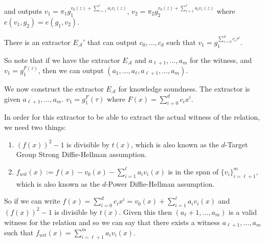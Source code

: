 \documentclass[12pt]{tufte-book}
\begin{document}
and outputs $v_1 = \pi_1 g_1^{v_0(z) + \sum_{i=1}^\ell a_i v_i(z)}$, $v_2 = \pi_2 g_2^{v_0(z) + \sum_{i=1}^\ell a_i v_i(z)}$ where $e(v_1, g_2) = e(g_1, v_2)$.

There is an extractor $E_\mathcal{A}'$ that can output $c_0, \dots, c_d$ such that $v_1 = g_1^{\sum_{i=0}^d c_i \tau^i}$.

So note that if we have the extractor $E_\mathcal{A}$ and $a_{\ell+1}, \dots, a_m$ for the witness, and $v_1 = g_1^{F(z)}$, then we can output $(a_1, \dots, a_\ell, a_{\ell+1}, \dots, a_m)$.

We now construct the extractor $E_\mathcal{A}$ for knowledge soundness. The extractor is given $a_{\ell+1}, \dots, a_m$. $v_1 = g_1^F(\tau)$ where $F(x) = \sum_{i=0}^d c_i x^i$.

In order for this extractor to be able to extract the actual witness of the relation, we need two things:
\begin{enumerate}
    \item $(f(x))^2 - 1$ is divisible by $t(x)$, which is also known as the $d$-Target Group Strong Diffie-Hellman assumption.
    \item $f_{wit}(x) := f(x) - v_0(x) - \sum_{i=1}^\ell a_i v_i(x)$ is in the span of $\{v_i\}_{i=\ell+1}^m$, which is also known as the $d$-Power Diffie-Hellman assumption.
\end{enumerate}

So if we can write $f(x) = \sum_{i=0}^d c_i x^i = v_0(x) + \sum_{i=1}^\ell a_i v_i(x)$ and $(f(x))^2 - 1$ is divisible by $t(x)$. Given this then $(a_\ell+1, \dots, a_m)$ is a valid witness for the relation and so we can say that there exists a witness $a_{\ell+1}, \dots, a_m$ such that $f_{wit}(x) = \sum_{i=\ell+1}^m a_i v_i(x)$.
 \newcommand{\proofsketch}{\smallskip\noindent{\bf Proof sketch. }}
\algrenewcommand{}
\newcommand{\bits}{\set{0,1}}
\newcommand{\Ex}{\mathbb{E}}

\renewcommand{\O}{\ensuremath{\mathcal{O}}}
\newcommand{\To}{\rightarrow}
\newcommand{\e}{\epsilon}
\newcommand{\R}{\mathbb{R}}
\newcommand{\N}{\mathbb{N}}
\newcommand{\Z}{\mathbb{Z}}
\newcommand{\logAnd}{\wedge}

\newcommand{\indis}{\mathrel{\overset{\makebox[0pt]{\mbox{\normalfont\tiny c}}}{\approx}}}
\newcommand{\allindis}{\mathrel{\overset{\makebox[0pt]{\mbox{\normalfont\tiny p/s/c}}}{\approx}}}

\newcommand{\cclass}[1]{\mathsf{#1}}
\renewcommand{\P}{\cclass{P}}
\newcommand{\NP}{\cclass{NP}}
\newcommand{\Time}{\cclass{Time}}
\newcommand{\BPP}{\cclass{BPP}}
\newcommand{\Size}{\cclass{Size}}
\newcommand{\Ppoly}{\cclass{P_{/poly}}}
\newcommand{\CSAT}{\ensuremath{\mathsf{CSAT}}}
\newcommand{\SAT}{\ensuremath{\mathsf{3SAT}}}
\newcommand{\IS}{\mathsf{INDSET}}
\end{document}
